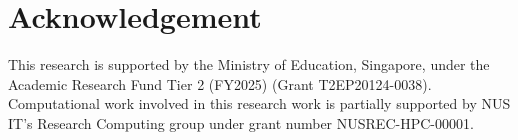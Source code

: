 \section*{Acknowledgement}

This research is supported by the Ministry of Education, Singapore, under the Academic Research Fund Tier 2 (FY2025) (Grant T2EP20124-0038). Computational work involved in this
research work is partially supported by NUS IT’s Research Computing group
under grant number NUSREC-HPC-00001.




